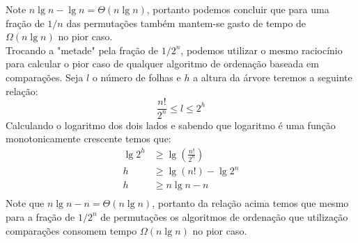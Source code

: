 Note $n\lg n - \lg n = \Theta(n \lg n)$, portanto podemos concluir que para uma 
fração de $1/n$ das permutações também mantem-se gasto de tempo de $\Omega(n \lg 
n)$ no pior caso.
\\[6pt]
Trocando a "metade" pela fração de $1/2^n$, podemos utilizar o mesmo raciocínio 
para calcular o pior caso de qualquer algoritmo de ordenação baseada em 
comparações. Seja $l$ o número de folhas e $h$ a altura da árvore teremos a 
seguinte relação:
\[ \frac{n!}{2^n} \leq l \leq 2^h \]
Calculando o logaritmo dos dois lados e sabendo que logaritmo é uma função 
monotonicamente crescente temos que:
\begin{align*}
     \lg 2^h  &\geq  \lg (\frac{n!}{2^n}) \\
     h & \geq \lg (n!) - \lg 2^n \\
     h & \geq n \lg n - n \\
\end{align*}
Note que $n \lg n - n = \Theta(n \lg n)$, portanto da relação acima temos que 
mesmo para a fração de $1/2^n$ de permutações os algoritmos de ordenação que 
utilização comparações consomem tempo $\Omega(n \lg n)$ no pior caso.
